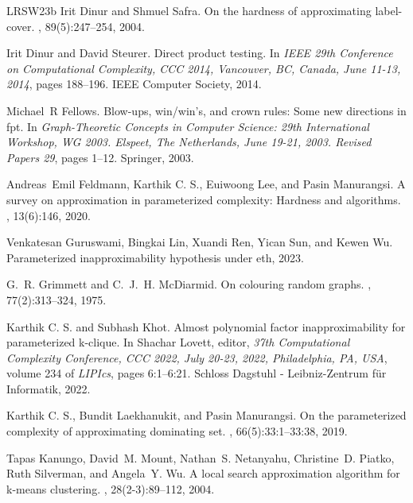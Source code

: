 \documentclass[10pt,a4paper]{article}
\begin{document}
\begin{thebibliography}{LRSW23b}
Irit Dinur and Shmuel Safra.
\newblock On the hardness of approximating label-cover.
, 89(5):247--254, 2004.

Irit Dinur and David Steurer.
\newblock Direct product testing.
\newblock In {\em {IEEE} 29th Conference on Computational Complexity, {CCC}
  2014, Vancouver, BC, Canada, June 11-13, 2014}, pages 188--196. {IEEE}
  Computer Society, 2014.

Michael~R Fellows.
\newblock Blow-ups, win/win’s, and crown rules: Some new directions in fpt.
\newblock In {\em Graph-Theoretic Concepts in Computer Science: 29th
  International Workshop, WG 2003. Elspeet, The Netherlands, June 19-21, 2003.
  Revised Papers 29}, pages 1--12. Springer, 2003.

Andreas~Emil Feldmann, {Karthik {C. S.}}, Euiwoong Lee, and Pasin Manurangsi.
\newblock A survey on approximation in parameterized complexity: Hardness and
  algorithms.
, 13(6):146, 2020.

Venkatesan Guruswami, Bingkai Lin, Xuandi Ren, Yican Sun, and Kewen Wu.
\newblock Parameterized inapproximability hypothesis under eth, 2023.

G.~R. Grimmett and C.~J.~H. McDiarmid.
\newblock On colouring random graphs.
, 77(2):313–324, 1975.

{Karthik {C. S.}} and Subhash Khot.
\newblock Almost polynomial factor inapproximability for parameterized
  k-clique.
\newblock In Shachar Lovett, editor, {\em 37th Computational Complexity
  Conference, {CCC} 2022, July 20-23, 2022, Philadelphia, PA, {USA}}, volume
  234 of {\em LIPIcs}, pages 6:1--6:21. Schloss Dagstuhl - Leibniz-Zentrum
  f{\"{u}}r Informatik, 2022.

{Karthik {C. S.}}, Bundit Laekhanukit, and Pasin Manurangsi.
\newblock On the parameterized complexity of approximating dominating set.
, 66(5):33:1--33:38, 2019.

Tapas Kanungo, David~M. Mount, Nathan~S. Netanyahu, Christine~D. Piatko, Ruth
  Silverman, and Angela~Y. Wu.
\newblock A local search approximation algorithm for k-means clustering.
, 28(2-3):89--112, 2004.


\end{thebibliography}
\end{document}
